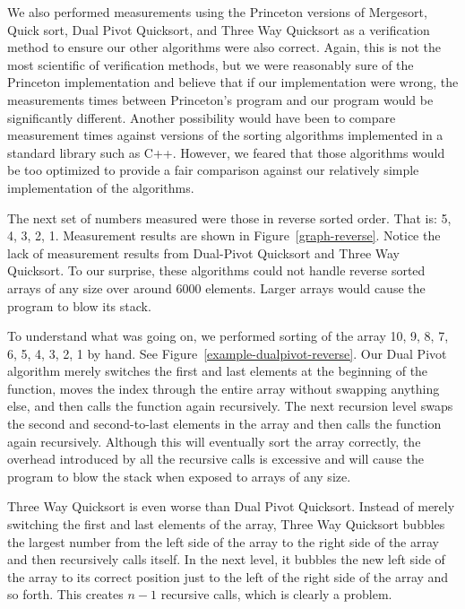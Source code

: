 \documentclass{article}
\begin{document}
We also performed measurements using the Princeton\cite{Princeton} versions of Mergesort,
Quick sort, Dual Pivot Quicksort, and Three Way Quicksort as a verification method to ensure
our other algorithms were also correct. Again, this is not the most scientific of verification methods,
but we were reasonably sure of the Princeton implementation and believe that if our
implementation were wrong, the measurements times between Princeton's program and our
program would be significantly different. Another possibility would have been to compare
measurement times against versions of the sorting algorithms implemented in a standard
library such as C++. However, we feared that those algorithms would be too optimized to
provide a fair comparison against our relatively simple implementation of the algorithms.

The next set of numbers measured were those in reverse sorted order. That is: 5, 4, 3, 2, 1.
Measurement results are shown in Figure~\ref{graph-reverse}. Notice the lack of 
measurement results from Dual-Pivot Quicksort and Three Way Quicksort. To our surprise,
these algorithms could not handle reverse sorted arrays of any size over around 6000
elements. Larger arrays would cause the program to blow its stack.

To understand what was going on, we performed sorting of the array {10, 9, 8, 7, 6, 5, 4, 3, 2, 1}
by hand. See Figure~\ref{example-dualpivot-reverse}. Our Dual Pivot algorithm merely
switches the first and last elements at the beginning of the function, moves the index
through the entire array without swapping anything else, and then calls the function again
recursively. The next recursion level swaps the second and second-to-last elements in the
array and then calls the function again recursively. Although this will eventually sort the 
array correctly, the overhead introduced by all the recursive calls is excessive and will
cause the program to blow the stack when exposed to arrays of any size. 

Three Way Quicksort is even worse than Dual Pivot Quicksort. Instead of merely switching
the first and last elements of the array, Three Way Quicksort bubbles the largest number
from the left side of the array to the right side of the array and then recursively calls itself.
In the next level, it bubbles the new left side of the array to its correct position just to the left of
the right side of the array and so forth. This creates $n-1$ recursive calls, which is clearly a
problem.
\end{document}
